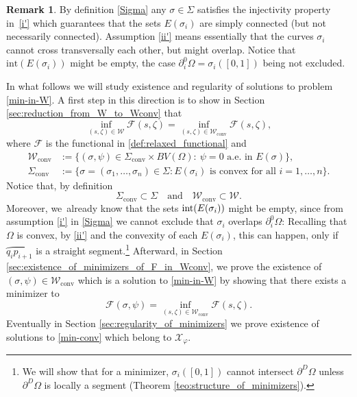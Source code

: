 \documentclass[JEP,XML,SOM,Unicode, NoFloatCountersInSection,published]{cedram}
\let\arc\wideparen
\let\curves\Sigma
\let\Om\Omega
\newcommand\admclassconv{{\mathcal W_\mathrm{conv}}}
\newcommand\convexcurves{\curves_\mathrm{conv}}
\newcommand{\nullb}{\partial^0}
\theoremstyle{definition}
\newtheorem{remark}[theorem]{Remark}
\begin{document}
\begin{remark} By definition \eqref{Sigma} any $\sigma\in \Sigma$ satisfies the injectivity property in~\ref{i'} which guarantees that the sets $E(\sigma_i)$
are simply connected (but not necessarily connected).
Assumption \ref{ii'} means essentially that
the curves $\sigma_i$
cannot cross
transversally each other, but might overlap. Notice that $\mathrm{int}(E(\sigma_i))$ might be empty,
the case $\nullb_i\Om=\sigma_i([0,1])$ being not excluded.
\end{remark}
In what follows we will study existence and regularity of solutions
to problem \eqref{min-in-W}. A first step
in this direction is to show in Section \ref{sec:reduction_from_W_to_Wconv}
that
\begin{equation}\label{equivalence-W-Wconv}
\inf_{(s,\zeta)\in \mathcal W}\mathcal F(s,\zeta)=
\inf_{(s,\zeta)\in \admclassconv}\mathcal F(s,\zeta),
\end{equation}
where $\mathcal{F}$ is the functional in \eqref{def:relaxed_functional} and
\begin{equation}\label{def:admissible_class}
\begin{split}
\admclassconv&:=\big\{(\sigma,\psi)\in \convexcurves\times BV(\Omega):
\ \psi=0\text{ a.e. in }E(\sigma)\big\},\\
\convexcurves&:=\big\{\sigma = (\sigma_1,\dots,\sigma_n)
\in \curves: E(\sigma_i) \text{ is convex for all } i=1,\dots,n\big\}.
\end{split}
\end{equation}
{ Notice that, by definition
\begin{equation}\label{eq:W_subset_hatW}
\convexcurves\subset\Sigma\quad\text{and}\quad \admclassconv\subset\mathcal W.
\end{equation}
}
Moreover, we~already know that the sets $\textup{int}(E(\sigma_i))$
might be empty, since from assumption \ref{i'} in \eqref{Sigma} we cannot exclude that $\sigma_i$
overlaps $\nullb_i\Omega$: Recalling that $\Omega$ is convex,
by \ref{ii'} and the convexity of
each $E(\sigma_i)$, this can happen, only if $\arc{q_ip_{i+1}}$
is a straight segment.\footnote{We will show
that for a minimizer, $\sigma_i([0,1])$ cannot intersect
$\partial^D \Omega$ unless $\partial^D \Omega$
is locally a segment (Theorem \ref{teo:structure_of_minimizers}).}
Afterward, in Section \ref{sec:existence_of_minimizers_of_F_in_Wconv},
we prove the existence of $(\sigma,\psi)\in
\admclassconv$ which is a solution to \eqref{min-in-W} by showing that there exists a minimizer to
\begin{equation}\label{min-conv}
\mathcal F(\sigma,\psi)=
\inf_{(s,\zeta)\in \admclassconv}\mathcal F(s,\zeta).
\end{equation}
Eventually in Section \ref{sec:regularity_of_minimizers}
we prove existence of solutions to \eqref{min-conv} which belong to $\mathcal X_\varphi$.
\end{document}
